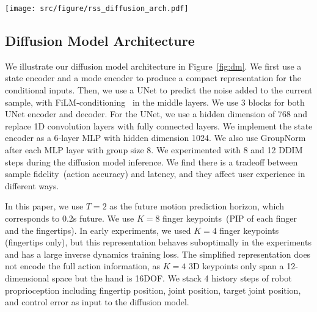 \begin{figure*}[t]
    \centering
    \texttt{[image: src/figure/rss\_diffusion\_arch.pdf]}
    \caption{Diffusion Model in \mname{} Controller. We use a standard U-Net based diffusion model with FiLM conditioning. }
    \label{fig:dm}
\end{figure*}
\subsection{Diffusion Model Architecture}
We illustrate our diffusion model architecture in Figure~\ref{fig:dm}. We first use a state encoder and a mode encoder to produce a compact representation for the conditional inputs. Then, we use a UNet to predict the noise added to the current sample, with FiLM-conditioning~\cite{perez2018film} in the middle layers. We use 3 blocks for both UNet encoder and decoder. For the UNet, we use a hidden dimension of 768 and replace 1D convolution layers with fully connected layers. We implement the state encoder as a 6-layer MLP with hidden dimension 1024. We also use GroupNorm after each MLP layer with group size 8. We experimented with 8 and 12 DDIM steps during the diffusion model inference. We find there is a tradeoff between sample fidelity~(action accuracy) and latency, and they affect user experience in different ways.

In this paper, we use $T=2$ as the future motion prediction horizon, which corresponds to 0.2s future. We use $K=8$ finger keypoints~(PIP of each finger and the fingertips). In early experiments, we used $K=4$ finger keypoints (fingertips only), but this representation behaves suboptimally in the experiments and has a large inverse dynamics training loss. The simplified representation does not encode the full action information, as $K=4$ 3D keypoints only span a 12-dimensional space but the hand is 16DOF. We stack 4 history steps of robot proprioception including fingertip position, joint position, target joint position, and control error as input to the diffusion model.

